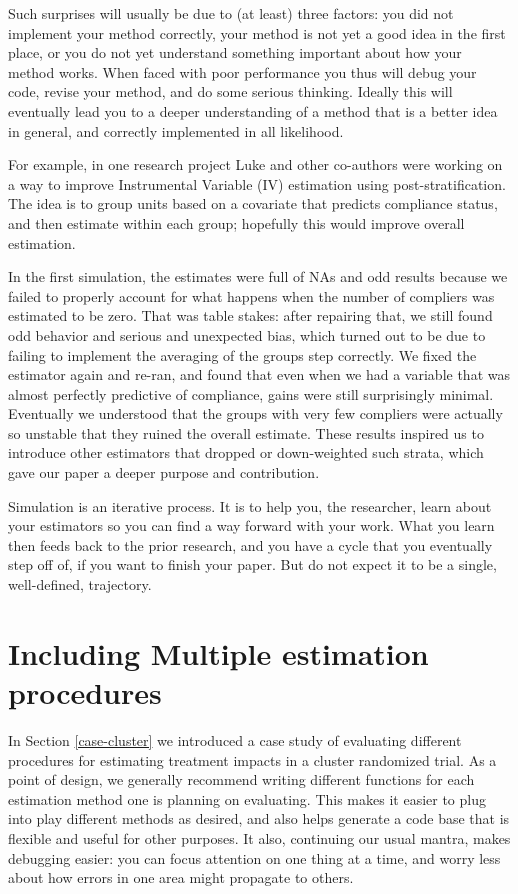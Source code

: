 \documentclass[
]{book}
\begin{document}
Such surprises will usually be due to (at least) three factors: you did not implement your method correctly, your method is not yet a good idea in the first place, or you do not yet understand something important about how your method works.
When faced with poor performance you thus will debug your code, revise your method, and do some serious thinking.
Ideally this will eventually lead you to a deeper understanding of a method that is a better idea in general, and correctly implemented in all likelihood.

For example, in one research project Luke and other co-authors were working on a way to improve Instrumental Variable (IV) estimation using post-stratification.
The idea is to group units based on a covariate that predicts compliance status, and then estimate within each group; hopefully this would improve overall estimation.

In the first simulation, the estimates were full of NAs and odd results because we failed to properly account for what happens when the number of compliers was estimated to be zero.
That was table stakes: after repairing that, we still found odd behavior and serious and unexpected bias, which turned out to be due to failing to implement the averaging of the groups step correctly.
We fixed the estimator again and re-ran, and found that even when we had a variable that was almost perfectly predictive of compliance, gains were still surprisingly minimal.
Eventually we understood that the groups with very few compliers were actually so unstable that they ruined the overall estimate.
These results inspired us to introduce other estimators that dropped or down-weighted such strata, which gave our paper a deeper purpose and contribution.

Simulation is an iterative process.
It is to help you, the researcher, learn about your estimators so you can find a way forward with your work.
What you learn then feeds back to the prior research, and you have a cycle that you eventually step off of, if you want to finish your paper.
But do not expect it to be a single, well-defined, trajectory.

\section{Including Multiple estimation procedures}\label{including-multiple-estimation-procedures}

In Section \ref{case-cluster} we introduced a case study of evaluating different procedures for estimating treatment impacts in a cluster randomized trial.
As a point of design, we generally recommend writing different functions for each estimation method one is planning on evaluating. This makes it easier to plug into play different methods as desired, and also helps generate a code base that is flexible and useful for other purposes.
It also, continuing our usual mantra, makes debugging easier: you can focus attention on one thing at a time, and worry less about how errors in one area might propagate to others.
\end{document}
